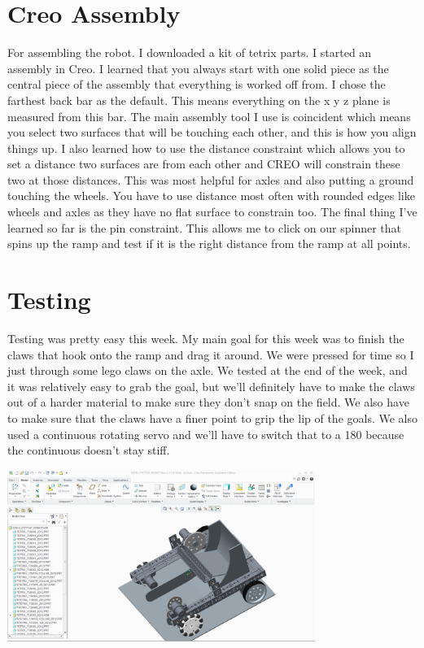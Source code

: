 \section*{Creo Assembly}
For assembling the robot. I downloaded a kit of tetrix parts. I started an assembly in Creo. I learned that you always start with one solid piece as the central piece of the assembly that everything is worked off from. I chose the farthest back bar as the default. This means everything on the x y z plane is measured from this bar. The main assembly tool I use is coincident which means you select two surfaces that will be touching each other, and this is how you align things up. I also learned how to use the distance constraint which allows you to set a distance two surfaces are from each other and CREO will constrain these two at those distances. This was most helpful for axles and also putting a ground touching the wheels. You have to use distance most often with rounded edges like wheels and axles as they have no flat surface to constrain too. The final thing I’ve learned so far is the pin constraint. This allows me to click on our spinner that spins up the ramp and test if it is the right distance from the ramp at all points.

\section*{Testing}
Testing was pretty easy this week. My main goal for this week was to finish the claws that hook onto the ramp and drag it around. We were pressed for time so I just through some lego claws on the axle. We tested at the end of the week, and it was relatively easy to grab the goal, but we’ll definitely have to make the claws out of a harder material to make sure they don’t snap on the field. We also have to make sure that the claws have a finer point to grip the lip of the goals. We also used a continuous rotating servo and we’ll have to switch that to a 180 because the continuous doesn’t stay stiff. 

\begin{center}
\includegraphics[width=10cm]{./Entries/Images/CreoModelOne.PNG}
\end{center}

